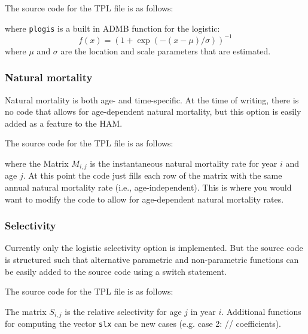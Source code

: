 \documentclass[12pt,letterpaper]{article}
\newcommand{\ham}{HAM}
\begin{document}
       The source code for the TPL file is as follows:
       \lstset{basicstyle=\footnotesize}
      
      where \texttt{plogis} is a built in ADMB function for the logistic: \[f(x) =  (1+\exp(-(x-\mu)/\sigma))^{-1} \] where $\mu$ and $\sigma$ are the location and scale parameters that are estimated.
    

    \subsubsection{Natural mortality} %
    \label{ssub:natural_mortality}
    
      Natural mortality is both age- and time-specific.  At the time of writing, there is no code that allows for age-dependent natural mortality, but this option is easily added as a feature to the \ham.

      The source code for the TPL file is as follows:
      
      where the Matrix $M_{i,j}$ is the instantaneous natural mortality rate for year $i$ and age $j$.  At this point the code just fills each row of the matrix with the same annual natural mortality rate (i.e., age-independent).  This is where you would want to modify the code to allow for age-dependent natural mortality rates.

    \subsubsection{Selectivity} %
    \label{ssub:selectivity}
      Currently only the logistic selectivity option is implemented. But the source code is structured such that alternative parametric and non-parametric functions can be easily added to the source code using a switch statement.

       The source code for the TPL file is as follows:
      

      The matrix $S_{i,j}$ is the relative selectivity for age $j$ in year $i$.  Additional functions for computing the vector \texttt{slx} can be new cases (e.g. case 2:  // coefficients).
\end{document}
